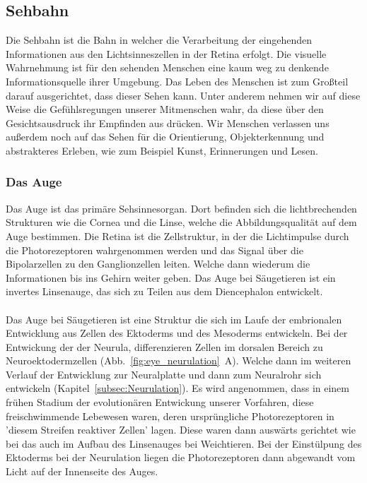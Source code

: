 \documentclass[12pt,a4paper,pdftex]{article}
\begin{document}
\newpage
\subsection{Sehbahn}

Die Sehbahn ist die Bahn in welcher die Verarbeitung der eingehenden Informationen aus den Lichtsinneszellen in der Retina erfolgt. Die visuelle Wahrnehmung ist für den sehenden Menschen eine kaum weg zu denkende Informationsquelle ihrer Umgebung. Das Leben des Menschen ist zum Großteil darauf ausgerichtet, dass dieser Sehen kann. Unter anderem nehmen wir auf diese Weise die Gefühlsregungen unserer Mitmenschen wahr, da diese über den Gesichtsausdruck ihr Empfinden aus drücken. Wir Menschen verlassen uns außerdem noch auf das Sehen für die Orientierung, Objekterkennung und abstrakteres Erleben, wie zum Beispiel Kunst, Erinnerungen und Lesen.


\subsubsection*{Das Auge}
Das Auge ist das primäre Sehsinnesorgan. Dort befinden sich die lichtbrechenden Strukturen wie die Cornea  und die Linse,  welche die Abbildungsqualität auf dem Auge bestimmen. Die Retina ist die Zellstruktur, in der die Lichtimpulse durch die Photorezeptoren wahrgenommen werden und das Signal über die Bipolarzellen zu den Ganglionzellen leiten. Welche dann wiederum die Informationen bis ins Gehirn weiter geben.
Das Auge bei Säugetieren ist ein invertes Linsenauge,  das sich zu Teilen aus dem Diencephalon entwickelt. 
\\
\\
Das Auge bei Säugetieren ist eine Struktur die sich im Laufe der embrionalen Entwicklung aus Zellen des Ektoderms und des Mesoderms entwickeln. Bei der Entwickung der der Neurula, differenzieren Zellen im dorsalen Bereich zu Neuroektodermzellen  (Abb.~\ref{fig:eye_neurulation}~A). Welche dann im weiteren Verlauf der Entwicklung zur Neuralplatte und dann zum Neuralrohr sich entwickeln (Kapitel~\ref{subsec:Neurulation}). 
Es wird angenommen, dass in einem frühen Stadium der evolutionären Entwickung unserer Vorfahren, diese freischwimmende Lebewesen waren, deren ursprüngliche Photorezeptoren in 'diesem Streifen reaktiver Zellen' lagen. Diese waren dann auswärts gerichtet wie bei das auch im Aufbau des Linsenauges bei Weichtieren. Bei der Einstülpung des Ektoderms bei der Neurulation liegen die Photorezeptoren dann abgewandt vom Licht auf der Innenseite des Auges. 
\end{document}
